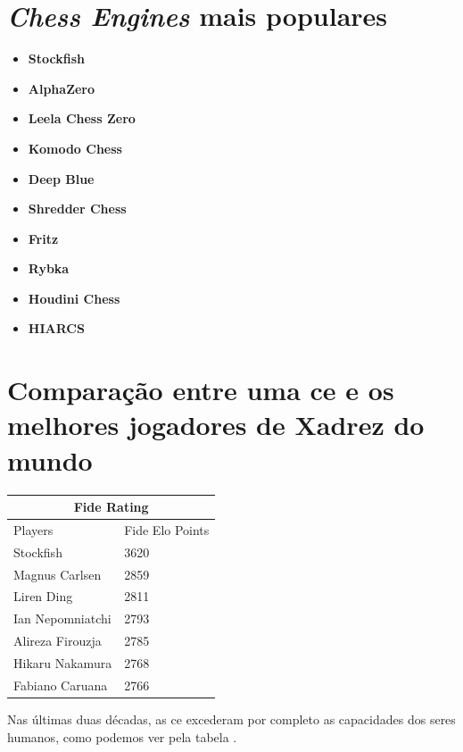 \documentclass{report}
\begin{document}
\section{\textit{Chess Engines} mais populares \cite{chessenginesmaispopulares}}
\begin{itemize}
        \item \textbf{Stockfish}
        \item \textbf{AlphaZero} 
        \item \textbf{Leela Chess Zero} 
        \item \textbf{Komodo Chess}
        \item \textbf{Deep Blue}
        \item \textbf{Shredder Chess}
        \item \textbf{Fritz}
        \item \textbf{Rybka}
        \item \textbf{Houdini Chess}
        \item \textbf{HIARCS}
\end{itemize}
\section{Comparação entre uma \ac{ce} e os melhores jogadores de Xadrez do mundo}

\begin{table}[h!]
\centering
\begin{tabular}{  |p{3cm}|p{3cm}|  }
\hline
\multicolumn{2}{|c|}{Fide Rating} \\
\hline
Players & Fide Elo Points\\
\hline
Stockfish & 3620 \\
Magnus Carlsen & 2859  \\
Liren Ding & 2811 \\
Ian Nepomniatchi & 2793 \\
Alireza Firouzja & 2785 \\
Hikaru Nakamura & 2768  \\
Fabiano Caruana & 2766  \\
\hline
\end{tabular}
\end{table}

Nas últimas duas décadas, as \ac{ce} excederam por completo as capacidades dos seres humanos, como podemos ver pela tabela \cite{chess}.


\newpage
\end{document}
